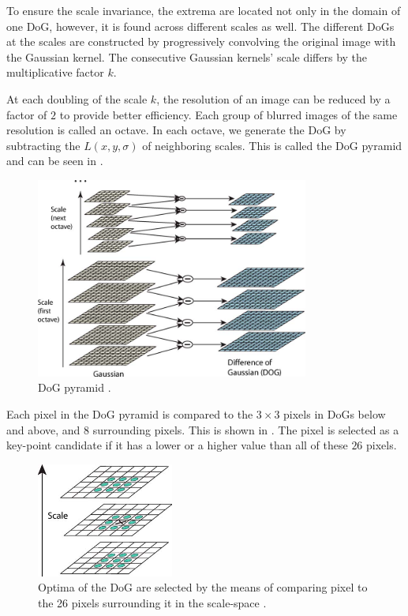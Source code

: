 To ensure the scale invariance, the extrema are located not only in the domain of one DoG, however, it is found across different scales as well. The different DoGs at the scales are constructed by progressively convolving the original image with the Gaussian kernel. The consecutive Gaussian kernels' scale differs by the multiplicative factor $k$.

At each doubling of the scale $k$, the resolution of an image can be reduced by a factor of $2$ to provide better efficiency. Each group of blurred images of the same resolution is called an octave. In each octave, we generate the DoG by subtracting the $L(x, y, \sigma)$ of neighboring scales. This is called the DoG pyramid and can be seen in .

\begin{figure}
    \centering
    \includegraphics[width=0.8\textwidth]{Figures/sift/pyramid.jpg}
    \caption[DoG pyramid]{DoG pyramid \cite{Lowe2004}.}
    \label{fig:DoG_pyramid}
\end{figure}

Each pixel in the DoG pyramid is compared to the $3\times3$ pixels in DoGs below and above, and $8$ surrounding pixels. This is shown in . The pixel is selected as a key-point candidate if it has a lower or a higher value than all of these $26$ pixels.

\begin{figure}
    \centering
    \includegraphics[width=0.4\textwidth]{Figures/sift/extrema.jpg}
    \caption[Optima of the DoG are selected by the means of comparing pixel to the 26 pixels surrounding it in the scale-space]{Optima of the DoG are selected by the means of comparing pixel to the 26 pixels surrounding it in the scale-space \cite{Lowe2004}.}
    \label{fig:DoG_extrema}
\end{figure}


